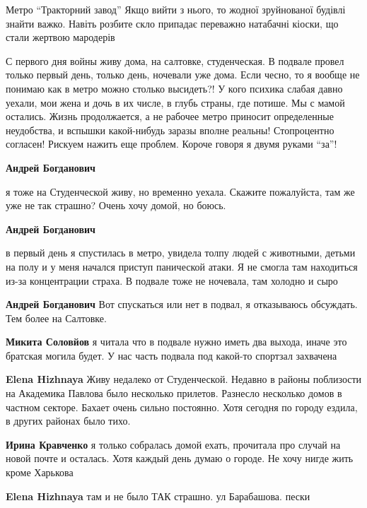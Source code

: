 \begin{itemize}

Метро \enquote{Тракторний завод} Якщо вийти з нього, то жодної зруйнованої будівлі
знайти важко. Навіть розбите скло припадає переважно натабачні кіоски, що стали
жертвою мародерів


С первого дня войны живу дома, на салтовке, студенческая. В подвале провел
только первый день, только день, ночевали уже дома. Если чесно, то я вообще не
понимаю как в метро можно столько высидеть?! У кого психика слабая давно
уехали, мои жена и дочь в их числе, в глубь страны, где потише. Мы с мамой
остались. Жизнь продолжается, а не рабочее метро приносит определенные
неудобства, и вспышки какой-нибудь заразы вполне реальны! Стопроцентно
согласен! Рискуем нажить еще проблем. Короче говоря я двумя руками \enquote{за}!

\begin{itemize} %
\textbf{Андрей Богданович} 

я тоже на Студенческой живу, но временно уехала. Скажите пожалуйста, там же уже
не так страшно? Очень хочу домой, но боюсь.

\textbf{Андрей Богданович} 

в первый день я спустилась в метро, увидела толпу людей с животными, детьми на
полу и у меня начался приступ панической атаки. Я не смогла там находиться
из-за концентрации страха. В подвале тоже не ночевала, там холодно и сыро

\textbf{Андрей Богданович} Вот спускаться или нет в подвал, я отказываюсь обсуждать. Тем более на Салтовке.

\textbf{Микита Соловйов} я читала что в подвале нужно иметь два выхода, иначе это братская могила будет. У нас часть подвала под какой-то спортзал захвачена

\textbf{Elena Hizhnaya} Живу недалеко от Студенческой. Недавно в районы поблизости на Академика Павлова было несколько прилетов. Разнесло несколько домов в частном секторе. Бахает очень сильно постоянно. Хотя сегодня по городу ездила, в других районах было тихо.

\textbf{Ирина Кравченко} я только собралась домой ехать, прочитала про случай на новой почте и осталась. Хотя каждый день думаю о городе. Не хочу нигде жить кроме Харькова

\textbf{Elena Hizhnaya} там и не было ТАК страшно. ул Барабашова. пески


\end{itemize}
\end{itemize}

